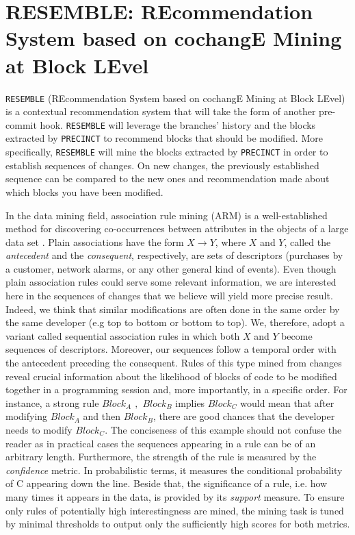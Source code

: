 
\section{RESEMBLE: REcommendation System based on cochangE Mining at Block LEvel\label{sec:RESEMBLE}}

{\tt RESEMBLE} (REcommendation System based on cochangE Mining at Block LEvel) is a contextual recommendation system that will take the form of another pre-commit hook. {\tt RESEMBLE} will leverage the branches' history and the blocks extracted by {\tt PRECINCT} to recommend blocks that should be modified.
More specifically, {\tt RESEMBLE} will mine the blocks extracted by {\tt PRECINCT}  in order to establish sequences of changes.
On new changes, the previously established sequence can be compared to the new ones and recommendation made about which blocks you have been modified.

In the data mining field, association rule mining (ARM) is a
well-established method for discovering co-occurrences between attributes
in the objects of a large data set \cite{Gregory1991,HEIKKI1997}. Plain
associations have the form $X \rightarrow Y$, where $X$ and $Y$,
called the \textit{antecedent} and the \textit{consequent}, respectively, are sets of descriptors
(purchases by a customer, network alarms, or any other general kind of events).
Even though plain association rules could serve some relevant information, we are interested here in
the sequences of changes that we believe will yield more precise result. Indeed, we think that similar modifications are often done in the same order by the same developer (e.g top to bottom or bottom to top).
We, therefore, adopt a variant called sequential association rules in which
both $X$ and $Y$ become sequences of descriptors.
Moreover, our sequences follow a temporal order with the antecedent preceding the consequent.
Rules of this type mined from changes reveal crucial
information about the likelihood of blocks of code to be modified together in a programming session
and, more importantly, in a specific order.
For instance, a strong rule \emph{$Block_A$ $,$ $Block_B$} implies \emph{$Block_C$} would mean that after modifying $Block_A$ and then $Block_B$, there are good chances that the developer needs to modify $Block_C$.
The conciseness of this example should not confuse the reader as in practical cases
the sequences appearing in a rule can be of an arbitrary length.
Furthermore, the strength of the rule is measured by the \textit{confidence} metric.
In probabilistic terms,
it measures the conditional probability of C appearing down the line.
Beside that, the significance of a rule, i.e. how many times it appears in the data, is provided by its \textit{support} measure.
To ensure only rules of potentially high interestingness are mined,
the mining task is tuned by minimal thresholds to
output only the sufficiently high scores for both metrics.

